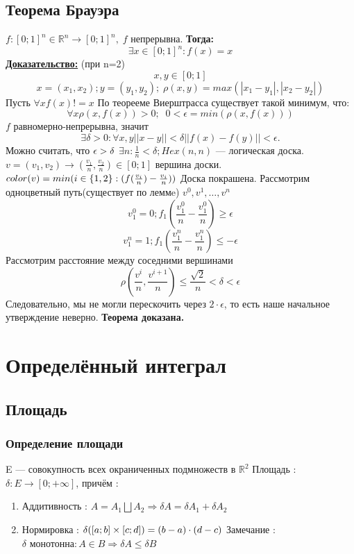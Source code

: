 \documentclass[12pt, a4paper]{article}
\newcommand{\nl}{\newline}
\newcommand{\proof}{\textbf{\underline{Доказательство:}} }
\newcommand{\then}{\textbf{Тогда:}}
\begin{document}
	\subsection{Теорема Брауэра}
	$f : [0; 1]^n \in \mathbb{R}^n \rightarrow [0; 1]^n, \; f $ непрерывна. \nl
	\then
	$$\exists x \in [0; 1]^n : f(x) = x$$
	\proof (при n=2) 
	$$ x, y \in [0; 1] $$
	$$ x = (x_1, x_2); y = (y_1, y_2); \; \rho(x,y) = max(|x_1-y_1|, |x_2-y_2|) $$
	Пусть $ \forall x f(x) != x$ \nl
	По теорееме Виерштрасса существует такой минимум, что: 
	$$ \forall x \rho(x, f(x))>0 ; \;\; 0 < \epsilon = min(\rho(x, f(x)))$$
	$f$ равномерно-непрерывна, значит 
	$$ \exists \delta > 0 : \forall x,y ||x-y|| < \delta ||f(x)-f(y)|| < \epsilon.$$ 
	Можно считать, что $\epsilon > \delta \nl$
	$ \exists n : \frac{1}{n} < \delta; Hex(n , n)$ — логическая доска.
	$v = (v_1, v_2) \rightarrow (\frac{v_1}{n}, \frac{v_2}{n}) \in [0; 1]$ вершина доски. \nl
	$color(v) = min(i \in \{1, 2\} : (f(\frac{v_i}{n})-\frac{v_i}{n})) \nl$ 
	Доска покрашена. \nl
	Рассмотрим одноцветный путь(существует по леммe) $v^0, v^1, \ldots , v^n$ 
	$$v^0_1 = 0; f_1(\frac{v^0_1}{n}-\frac{v^0_1}{n}) \geqslant\epsilon$$ 
	$$v^n_1 = 1; f_1(\frac{v^n_1}{n}-\frac{v^n_1}{n}) \leqslant-\epsilon$$ 
	Рассмотрим расстояние между соседними вершинами 
	$$ \rho(\frac{v^i}{n}, \frac{v^{i+1}}{n}) \leqslant \frac{\sqrt{2}}{n} < \delta < \epsilon $$
	Следовательно, мы не могли перескочить через $2 \cdot \epsilon$, то есть наше начальное утверждение неверно. \nl
	\textbf{Теорема доказана.}
	
	\section{Определённый интеграл}
	\subsection{Площадь}
	\subsubsection{Определение площади}
	E — совокупность всех окраниченных подмножеств в $\mathbb{R}^2$ \nl
	Площадь : $\delta : E \rightarrow [0; +\infty]$, причём :
	\begin{enumerate}
		\item Аддитивность : $A = A_1 \bigsqcup A_2 \Rightarrow \delta A = \delta A_1 + \delta A_2$
		\item Нормировка : $\delta([a; b] \times [c; d]) = (b-a) \cdot (d-c) \nl$
		Замечание : $\delta \text{ монотонна} : A \in B \Rightarrow \delta A \leqslant \delta B$
	\end{enumerate}
	
\end{document}
